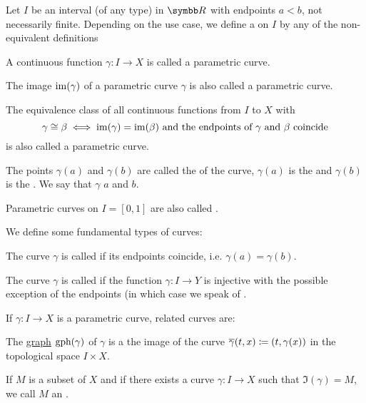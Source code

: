 \begin{definition}\label{def:parametric_curve}
   Let \( I \) be an interval (of any type) in \( \BR \) with endpoints \( a < b \), not necessarily finite. Depending on the use case, we define a  on \( I \) by any of the non-equivalent definitions

  \begin{defenum}
     A continuous function \( \gamma: I \to X \) is called a parametric curve.

     The image \( \operatorname{im}(\gamma) \) of a parametric curve \( \gamma \) is also called a parametric curve.

     The equivalence class of all continuous functions from \( I \) to \( X \) with
    \begin{equation*}
      \gamma \cong \beta \iff \operatorname{im}(\gamma) = \operatorname{im}(\beta) \text{ and the endpoints of } \gamma \text{ and } \beta \text{ coincide}
    \end{equation*}
    is also called a parametric curve.
  \end{defenum}

  The points \( \gamma(a) \) and \( \gamma(b) \) are called the  of the curve, \( \gamma(a) \) is the  and \( \gamma(b) \) is the . We say that \( \gamma \)  \( a \) and \( b \).

  Parametric curves on \( I = [0, 1] \) are also called .

  We define some fundamental types of curves:
  \begin{defenum}
     The curve \( \gamma \) is called  if its endpoints coincide, i.e. \( \gamma(a) = \gamma(b) \).

     The curve \( \gamma \) is called  if the function \( \gamma: I \to Y \) is injective with the possible exception of the endpoints (in which case we speak of .
  \end{defenum}

  If \( \gamma: I \to X \) is a parametric curve, related curves are:
  \begin{defenum}
    \cite[definition 1.20]{Иванов2017} The \hyperref[def:function/graph]{graph} \( \operatorname{gph}(\gamma) \) of \( \gamma \) is a the image of the curve \( \overline{\gamma}(t, x) \coloneqq (t, \gamma(x)) \) in the topological space \( I \times X \).

    \cite[definition 1.24]{Иванов2017} If \( M \) is a subset of \( X \) and if there exists a curve \( \gamma: I \to X \) such that \( \Im(\gamma) = M \), we call \( M \) an .
  \end{defenum}
\end{definition}

